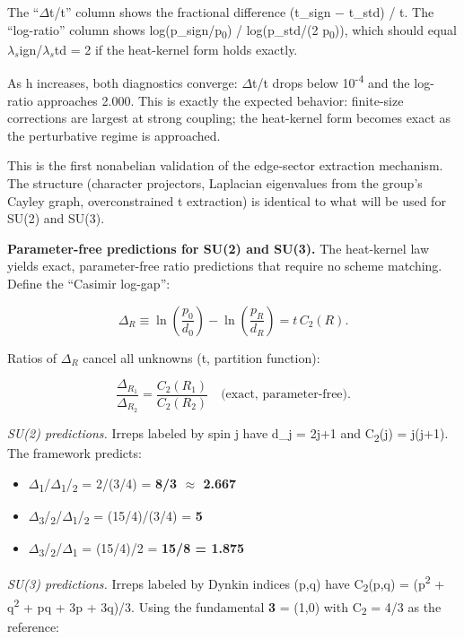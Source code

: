 \documentclass[11pt,a4paper]{article}
\theoremstyle{remark}
\providecommand{\tightlist}{%
  \setlength{\itemsep}{0pt}\setlength{\parskip}{0pt}}
\begin{document}
The ``\ensuremath{\Delta}t/t'' column shows the fractional difference (t\_sign \ensuremath{-}
t\_std) / t. The ``log-ratio'' column shows
log(p\_sign/p\textsubscript{0}) / log(p\_std/(2 p\textsubscript{0})), which should
equal \(\lambda{}_s\)ign/\(\lambda{}_s\)td = 2 if the heat-kernel
form holds exactly.

As h increases, both diagnostics converge: \ensuremath{\Delta}t/t drops below 10\textsuperscript{-4}
and the log-ratio approaches 2.000. This is exactly the expected behavior:
finite-size corrections are largest at strong coupling; the heat-kernel form
becomes exact as the perturbative regime is approached.

This is the first nonabelian validation of the edge-sector extraction mechanism.
The structure (character projectors, Laplacian eigenvalues from the group's
Cayley graph, overconstrained t extraction) is identical to what will be used
for SU(2) and SU(3).

\textbf{Parameter-free predictions for SU(2) and SU(3).} The heat-kernel law yields
exact, parameter-free ratio predictions that require no scheme matching. Define
the ``Casimir log-gap'':

\[
\Delta_R \equiv \ln\left(\frac{p_0}{d_0}\right) - \ln\left(\frac{p_R}{d_R}\right)
= t \, C_2(R).
\]

Ratios of \(\Delta_R\) cancel all unknowns (t, partition function):

\[
\frac{\Delta_{R_1}}{\Delta_{R_2}} = \frac{C_2(R_1)}{C_2(R_2)}
\quad \text{(exact, parameter-free).}
\]

\emph{SU(2) predictions.} Irreps labeled by spin j have d\_j = 2j+1 and
C\textsubscript{2}(j) = j(j+1). The framework predicts:

\begin{itemize}
\tightlist
\item
  \ensuremath{\Delta}\textsubscript{1}/\ensuremath{\Delta}\textsubscript{1}/\textsubscript{2} = 2/(3/4) = \textbf{8/3 \ensuremath{\approx} 2.667}
\item
  \ensuremath{\Delta}\textsubscript{3}/\textsubscript{2}/\ensuremath{\Delta}\textsubscript{1}/\textsubscript{2} = (15/4)/(3/4) = \textbf{5}
\item
  \ensuremath{\Delta}\textsubscript{3}/\textsubscript{2}/\ensuremath{\Delta}\textsubscript{1} = (15/4)/2 = \textbf{15/8 = 1.875}
\end{itemize}

\emph{SU(3) predictions.} Irreps labeled by Dynkin indices (p,q) have
C\textsubscript{2}(p,q) = (p\textsuperscript{2} + q\textsuperscript{2} + pq + 3p + 3q)/3. Using the fundamental \textbf{3} = (1,0)
with C\textsubscript{2} = 4/3 as the reference:
\end{document}
